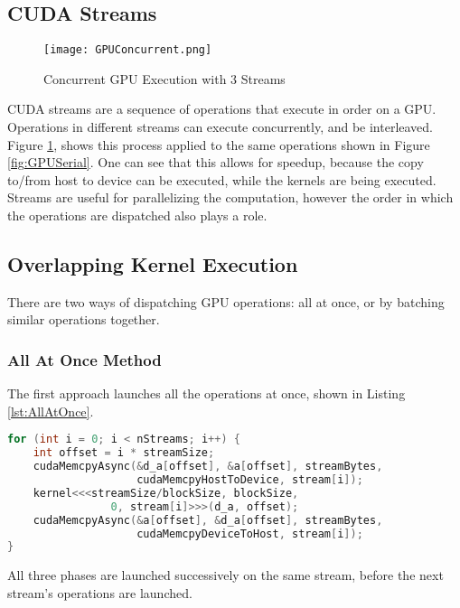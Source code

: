 \subsection{CUDA Streams}
\begin{figure}[htp]
\centering
\texttt{[image: GPUConcurrent.png]}
\caption{Concurrent GPU Execution with 3 Streams}
\label{fig:GPUConcurrent}
\end{figure}
CUDA streams are a sequence of operations that execute in order on a GPU. Operations in different streams can execute concurrently, and be interleaved. Figure \ref{fig:GPUConcurrent}, shows this process applied to the same operations shown in Figure \ref{fig:GPUSerial}. One can see that this allows for speedup, because the copy to/from host to device can be executed, while the kernels are being executed. Streams are useful for parallelizing the computation, however the order in which the operations are dispatched also plays a role.

\subsection{Overlapping Kernel Execution}
There are two ways of dispatching GPU operations: all at once, or by batching similar operations together.

\subsubsection{All At Once Method}
The first approach launches all the operations at once, shown in Listing \ref{lst:AllAtOnce}.
\begin{lstlisting}[language=C++,caption={Operations launched all at once},label={lst:AllAtOnce}]
for (int i = 0; i < nStreams; i++) {
    int offset = i * streamSize;
    cudaMemcpyAsync(&d_a[offset], &a[offset], streamBytes, 
                    cudaMemcpyHostToDevice, stream[i]);
    kernel<<<streamSize/blockSize, blockSize, 
                0, stream[i]>>>(d_a, offset);
    cudaMemcpyAsync(&a[offset], &d_a[offset], streamBytes, 
                    cudaMemcpyDeviceToHost, stream[i]);
}
\end{lstlisting}
All three phases are launched successively on the same stream, before the next stream's operations are launched. 
